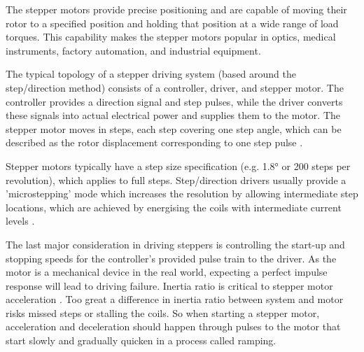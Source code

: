 The stepper motors provide precise positioning and are capable of moving their rotor to a specified position and holding that position at a wide range of load torques. This capability makes the stepper motors popular in optics, medical instruments, factory automation, and industrial equipment.

The typical topology of a stepper driving system (based around the step/direction method) consists of a controller, driver, and stepper motor. The controller provides a direction signal and step pulses, while the driver converts these signals into actual electrical power and supplies them to the motor. The stepper motor moves in steps, each step covering one step angle, which can be described as the rotor displacement corresponding to one step pulse \cite{step_app}.

Stepper motors typically have a step size specification (e.g. 1.8° or 200 steps per revolution), which applies to full steps. Step/direction drivers usually provide a 'microstepping' mode which increases the resolution by allowing intermediate step locations, which are achieved by energising the coils with intermediate current levels \cite{step_book}.

The last major consideration in driving steppers is controlling the start-up and stopping speeds for the controller's provided pulse train to the driver. As the motor is a mechanical device in the real world, expecting a perfect impulse response will lead to driving failure. Inertia ratio is critical to stepper motor acceleration \cite{step_book}. Too great a difference in inertia ratio between system and motor risks missed steps or stalling the coils. So when starting a stepper motor, acceleration and deceleration should happen through pulses to the motor that start slowly and gradually quicken in a process called ramping.